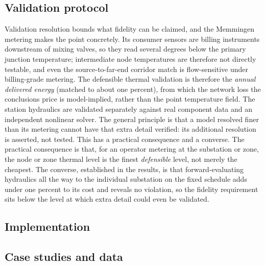 \documentclass[a4paper,fleqn]{cas-sc}
\newcommand{\new}[1]{\textcolor[HTML]{1A5FB4}{#1}}   %
\newcommand{\new}[1]{#1}
\begin{document}
\subsection{Validation protocol}
\new{}

Validation resolution bounds what fidelity can be claimed, and the Memmingen metering makes the
point concretely. Its consumer sensors are billing instruments downstream of mixing valves, so
they read several degrees below the primary junction temperature; intermediate node temperatures
are therefore not directly testable, and even the source-to-far-end corridor match is
flow-sensitive under billing-grade metering. The defensible thermal validation is therefore the
\emph{annual delivered energy} (matched to about one percent), from which the network loss the
conclusions price is model-implied, rather than the point temperature field. The station hydraulics are validated separately against real component data and an
independent nonlinear solver. The general principle is that a model resolved finer than its
metering cannot have that extra detail verified: its additional resolution is asserted, not
tested. This has a practical
consequence and a converse. The practical consequence is that, for an operator metering at the
substation or zone, the node or zone thermal level is the finest \emph{defensible} level, not
merely the cheapest. The converse, established in the results, is that forward-evaluating
hydraulics all the way to the individual substation on the fixed schedule adds under one percent
to its cost and reveals no violation, so the fidelity requirement sits below the level at which
extra detail could even be validated.

\subsection{Implementation}
\new{}

\subsection{Case studies and data}
\label{sec:cases}
\end{document}

